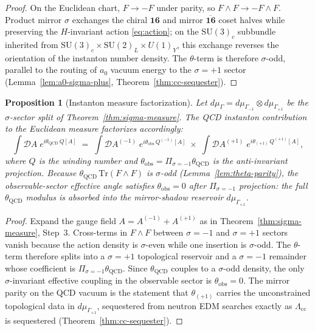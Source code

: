 \documentclass[aps,prd,onecolumn,amsmath,amssymb,nofootinbib,11pt]{revtex4-2}
\numberwithin{equation}{section}
\theoremstyle{plain}
\newtheorem{proposition}[theorem]{Proposition}
\theoremstyle{definition}
\theoremstyle{remark}
\begin{document}
\begin{proof}
On the Euclidean chart, $F\to -F$ under parity, so
$F\wedge F\to -F\wedge F$. Product mirror $\sigma$ exchanges the chiral
$\mathbf{16}$ and mirror $\overline{\mathbf{16}}$ coset halves while
preserving the $H$-invariant action \eqref{eq:action}; on the $\mathrm{SU}(3)_c$
subbundle inherited from $\mathrm{SU}(3)_c\times\mathrm{SU}(2)_L\times U(1)_Y$,
this exchange reverses the orientation of the instanton number density.
The $\theta$-term is therefore $\sigma$-odd, parallel to the routing of
$a_0$ vacuum energy to the $\sigma=+1$ sector
(Lemma~\ref{lem:a0-sigma-plus}, Theorem~\ref{thm:cc-sequester}).
\end{proof}

\begin{proposition}[Instanton measure factorization]
\label{prop:theta-measure}
Let $d\mu_\Gamma=d\mu_{\Gamma_{-1}}\otimes d\mu_{\Gamma_{+1}}$ be the
$\sigma$-sector split of Theorem~\ref{thm:sigma-measure}. The QCD instanton
contribution to the Euclidean measure factorizes accordingly:
\begin{equation}\label{eq:theta-measure}
  \int \mathcal{D}A\;
  e^{i\theta_{\mathrm{QCD}}\,Q[A]}
  \;=\;
  \int \mathcal{D}A^{(-1)}\;
  e^{i\theta_{\mathrm{obs}}\,Q^{(-1)}[A]}
  \;\times\;
  \int \mathcal{D}A^{(+1)}\;
  e^{i\theta_{(+1)}\,Q^{(+1)}[A]},
\end{equation}
where $Q$ is the winding number and
$\theta_{\mathrm{obs}}=\Pi_{\sigma=-1}\theta_{\mathrm{QCD}}$ is the
anti-invariant projection. Because
$\theta_{\mathrm{QCD}}\,\mathrm{Tr}(F\wedge F)$ is $\sigma$-odd
(Lemma~\ref{lem:theta-parity}), the observable-sector effective angle satisfies
$\theta_{\mathrm{obs}}=0$ after $\Pi_{\sigma=-1}$ projection: the full
$\theta_{\mathrm{QCD}}$ modulus is absorbed into the mirror-shadow reservoir
$d\mu_{\Gamma_{+1}}$.
\end{proposition}

\begin{proof}
Expand the gauge field $A=A^{(-1)}+A^{(+1)}$ as in
Theorem~\ref{thm:sigma-measure}, Step~3. Cross-terms in $F\wedge F$ between
$\sigma=-1$ and $\sigma=+1$ sectors vanish because the action density is
$\sigma$-even while one insertion is $\sigma$-odd. The $\theta$-term therefore
splits into a $\sigma=+1$ topological reservoir and a $\sigma=-1$ remainder
whose coefficient is $\Pi_{\sigma=-1}\theta_{\mathrm{QCD}}$. Since
$\theta_{\mathrm{QCD}}$ couples to a $\sigma$-odd density, the only
$\sigma$-invariant effective coupling in the observable sector is
$\theta_{\mathrm{obs}}=0$. The mirror parity on the QCD vacuum is the
statement that $\theta_{(+1)}$ carries the unconstrained topological data in
$d\mu_{\Gamma_{+1}}$, sequestered from neutron EDM searches exactly as
$\Lambda_{\mathrm{cc}}$ is sequestered (Theorem~\ref{thm:cc-sequester}).
\end{proof}
\end{document}
